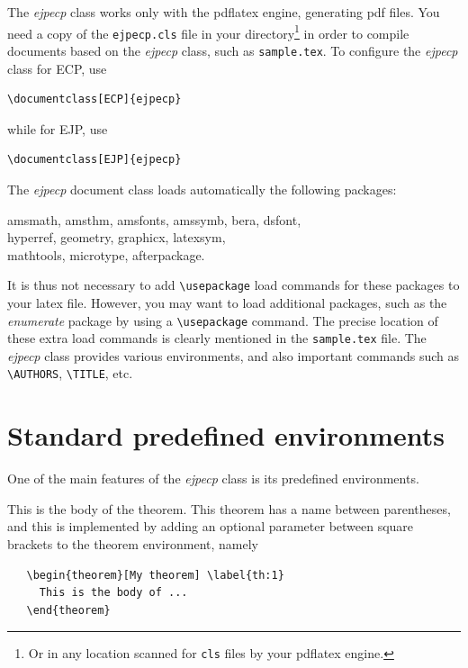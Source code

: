 \documentclass[ECP]{ejpecp} %
\begin{document}
The \emph{ejpecp} class works only with the pdflatex engine, generating pdf
files. You need a copy of the \texttt{ejpecp.cls} file in your
directory\footnote{Or in any location scanned for \texttt{cls} files by your
  pdflatex engine.} in order to compile documents based on the \emph{ejpecp}
class, such as \texttt{sample.tex}. To configure the \emph{ejpecp} class for
ECP, use
\begin{verbatim}
\documentclass[ECP]{ejpecp}
\end{verbatim}
while for EJP, use
\begin{verbatim}
\documentclass[EJP]{ejpecp}
\end{verbatim}
The \emph{ejpecp} document class loads automatically the following packages:
\begin{center}
  \ttfamily
  amsmath, amsthm, amsfonts, amssymb, bera, dsfont, \\
  hyperref, geometry, graphicx, latexsym, \\
  mathtools, microtype, afterpackage.
\end{center}
It is thus not necessary to add \verb+\usepackage+ load commands for
these packages to your latex file. However, you may want to load additional
packages, such as the \emph{enumerate} package by using a \verb+\usepackage+
command. The precise location of these extra load commands is clearly
mentioned in the \texttt{sample.tex} file. The \emph{ejpecp} class provides
various environments, and also important commands such as \verb+\AUTHORS+,
\verb+\TITLE+, etc.

\section{Standard predefined environments}

One of the main features of the \emph{ejpecp} class is its predefined
environments.

 \begin{theorem}[My theorem]\label{th:1}
   This is the body of the theorem. This theorem has a name between
   parentheses, and this is implemented by adding an optional parameter
   between square brackets to the theorem environment, namely
\begin{verbatim}
   \begin{theorem}[My theorem] \label{th:1}
     This is the body of ...
   \end{theorem}
\end{verbatim}
 \end{theorem}
\end{document}
